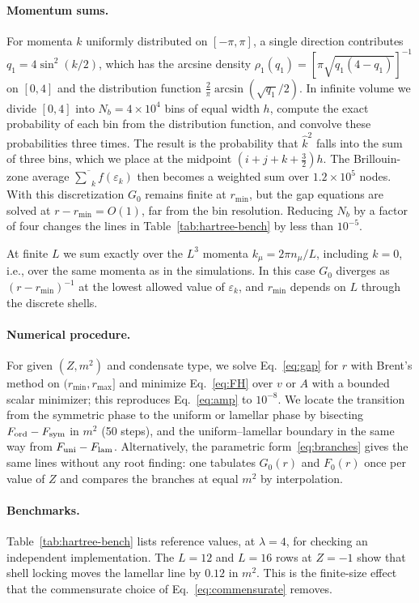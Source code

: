 \documentclass[aps,prd,twocolumn,superscriptaddress,nofootinbib,10pt]{revtex4-2}
\newcommand{\khat}{\widehat{k}^{2}}
\begin{document}
\paragraph*{Momentum sums.}
For momenta $k$ uniformly distributed on $[-\pi,\pi]$, a single direction
contributes $q_1=4\sin^2(k/2)$, which has the arcsine density
$\rho_1(q_1)=[\pi\sqrt{q_1(4-q_1)}]^{-1}$ on $[0,4]$ and the distribution
function $\frac2\pi\arcsin(\sqrt{q_1}/2)$.  In infinite volume we divide
$[0,4]$ into $N_b=4\times10^4$ bins of equal width $h$, compute the exact
probability of each bin from the distribution function, and convolve these
probabilities three times.  The result is the probability that $\khat$
falls into the sum of three bins, which we place at the midpoint
$(i+j+k+\frac32)h$.  The Brillouin-zone average
$\overline\sum_kf(\varepsilon_k)$ then becomes a weighted sum over
$1.2\times10^5$ nodes.  With this discretization $G_0$ remains finite at
$r_{\min}$, but the gap equations are solved at $r-r_{\min}=O(1)$, far from
the bin resolution.  Reducing $N_b$ by a factor of four changes the lines in
Table~\ref{tab:hartree-bench} by less than $10^{-5}$.

At finite $L$ we sum exactly over the $L^3$ momenta $k_\mu=2\pi n_\mu/L$,
including $k=0$, i.e., over the same momenta as in the simulations.  In this
case $G_0$ diverges as $(r-r_{\min})^{-1}$ at the lowest allowed value of
$\varepsilon_k$, and $r_{\min}$ depends on $L$ through the discrete shells.

\paragraph*{Numerical procedure.}
For given $(Z,m^2)$ and condensate type, we solve Eq.~\eqref{eq:gap} for $r$
with Brent's method on $(r_{\min},r_{\max}]$ and minimize Eq.~\eqref{eq:FH}
over $v$ or $A$ with a bounded scalar minimizer; this reproduces
Eq.~\eqref{eq:amp} to $10^{-8}$.  We locate the transition from the symmetric
phase to the uniform or lamellar phase by bisecting
$F_{\rm ord}-F_{\rm sym}$ in $m^2$ (50 steps), and the uniform--lamellar
boundary in the same way from $F_{\rm uni}-F_{\rm lam}$.  Alternatively, the
parametric form~\eqref{eq:branches} gives the same lines without any root
finding: one tabulates $G_0(r)$ and $F_0(r)$ once per value of $Z$ and
compares the branches at equal $m^2$ by interpolation.

\paragraph*{Benchmarks.}
Table~\ref{tab:hartree-bench} lists reference values, at $\lambda=4$, for
checking an independent implementation.  The $L=12$ and $L=16$ rows at $Z=-1$
show that shell locking moves the lamellar line by $0.12$ in $m^2$.  This is
the finite-size effect that the commensurate choice of
Eq.~\eqref{eq:commensurate} removes.
\end{document}
